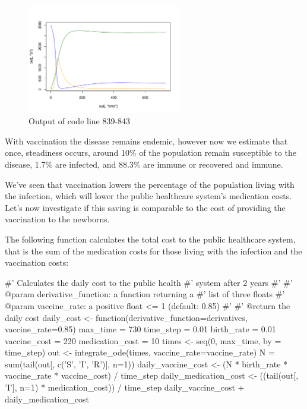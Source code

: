 \begin{figure}
\begin{center}
\includegraphics[width=0.6\textwidth]{./assets/plot_with_vaccine_R.pdf}
\end{center}
\caption{Output of code line 839-843}
\label{fig:plot_with_vaccine_R}
\end{figure}

With vaccination the disease remains endemic, however now we estimate that once,
steadiness occurs, around 10\% of the population remain susceptible to the
disease, 1.7\% are infected, and 88.3\% are immune or recovered and immune.

We've seen that vaccination lowers the percentage of the population living with
the infection, which will lower the public healthcare system's medication costs.
Let's now investigate if this saving is comparable to the cost of providing the
vaccination to the newborns.

The following function calculates the total cost to the public healthcare
system, that is the sum of the medication costs for those living with the
infection and the vaccination costs:

\begin{Rin}
#' Calculates the daily cost to the public health
#' system after 2 years
#'
#' @param derivative_function: a function returning a
#'                             list of three floats
#' @param vaccine_rate: a positive float <= 1 (default: 0.85)
#'
#' @return the daily cost
daily_cost <- function(derivative_function=derivatives,
                       vaccine_rate=0.85){
  max_time = 730
  time_step = 0.01
  birth_rate = 0.01
  vaccine_cost = 220
  medication_cost = 10
  times <- seq(0, max_time, by = time_step)
  out <- integrate_ode(times, vaccine_rate=vaccine_rate)
  N = sum(tail(out[, c('S', 'I', 'R')], n=1))
  daily_vaccine_cost <- (N
                         * birth_rate
                         * vaccine_rate
                         * vaccine_cost) / time_step
  daily_medication_cost <- ((tail(out[, 'I'], n=1)
                             * medication_cost)) / time_step
  daily_vaccine_cost + daily_medication_cost
}
\end{Rin}

